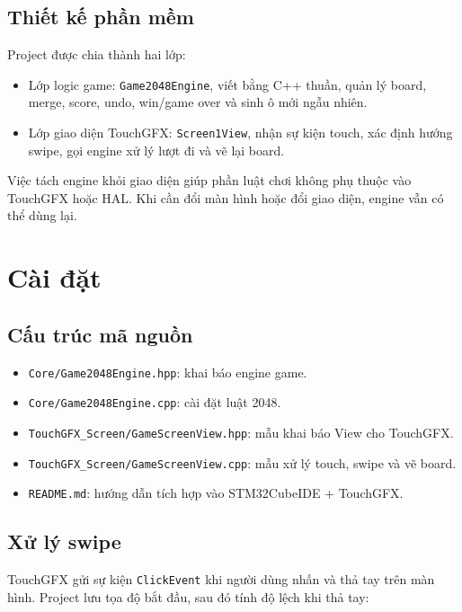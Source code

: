 \documentclass[12pt,a4paper]{article}
\begin{document}
\subsection{Thiết kế phần mềm}

Project được chia thành hai lớp:

\begin{itemize}
    \item Lớp logic game: \texttt{Game2048Engine}, viết bằng C++ thuần, quản lý board, merge, score, undo, win/game over và sinh ô mới ngẫu nhiên.
    \item Lớp giao diện TouchGFX: \texttt{Screen1View}, nhận sự kiện touch, xác định hướng swipe, gọi engine xử lý lượt đi và vẽ lại board.
\end{itemize}

Việc tách engine khỏi giao diện giúp phần luật chơi không phụ thuộc vào TouchGFX hoặc HAL. Khi cần đổi màn hình hoặc đổi giao diện, engine vẫn có thể dùng lại.

\section{Cài đặt}

\subsection{Cấu trúc mã nguồn}

\begin{itemize}
    \item \texttt{Core/Game2048Engine.hpp}: khai báo engine game.
    \item \texttt{Core/Game2048Engine.cpp}: cài đặt luật 2048.
    \item \texttt{TouchGFX\_Screen/GameScreenView.hpp}: mẫu khai báo View cho TouchGFX.
    \item \texttt{TouchGFX\_Screen/GameScreenView.cpp}: mẫu xử lý touch, swipe và vẽ board.
    \item \texttt{README.md}: hướng dẫn tích hợp vào STM32CubeIDE + TouchGFX.
\end{itemize}

\subsection{Xử lý swipe}

TouchGFX gửi sự kiện \texttt{ClickEvent} khi người dùng nhấn và thả tay trên màn hình. Project lưu tọa độ bắt đầu, sau đó tính độ lệch khi thả tay:
\end{document}
